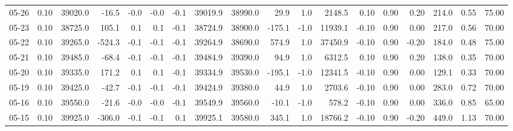 \begin{threeparttable}
{\begin{tabular}{lrrrrrrrrrrrrrrrrr}
  05-26 &     0.10 & 39020.0 &             -16.5 &              -0.0 &               -0.0 &               -0.1 & 39019.9 & 38990.0 &       29.9 &                      1.0 &              2148.5 &       0.10 &      0.90 &           0.20 &            214.0 &            0.55 &                  75.00 \\
  05-23 &     0.10 & 38725.0 &             105.1 &               0.1 &                0.1 &               -0.1 & 38724.9 & 38900.0 &     -175.1 &                     -1.0 &             11939.1 &      -0.10 &      0.90 &           0.00 &            217.0 &            0.56 &                  70.00 \\
  05-22 &     0.10 & 39265.0 &            -524.3 &              -0.1 &               -0.1 &               -0.1 & 39264.9 & 38690.0 &      574.9 &                      1.0 &             37450.9 &      -0.10 &      0.90 &          -0.20 &            184.0 &            0.48 &                  75.00 \\
  05-21 &     0.10 & 39485.0 &             -68.4 &              -0.1 &               -0.1 &               -0.1 & 39484.9 & 39390.0 &       94.9 &                      1.0 &              6312.5 &       0.10 &      0.90 &           0.20 &            138.0 &            0.35 &                  70.00 \\
  05-20 &     0.10 & 39335.0 &             171.2 &               0.1 &                0.1 &               -0.1 & 39334.9 & 39530.0 &     -195.1 &                     -1.0 &             12341.5 &      -0.10 &      0.90 &           0.00 &            129.1 &            0.33 &                  70.00 \\
  05-19 &     0.10 & 39425.0 &             -42.7 &              -0.1 &               -0.1 &               -0.1 & 39424.9 & 39380.0 &       44.9 &                      1.0 &              2703.6 &      -0.10 &      0.90 &           0.00 &            283.0 &            0.72 &                  70.00 \\
  05-16 &     0.10 & 39550.0 &             -21.6 &              -0.0 &               -0.0 &               -0.1 & 39549.9 & 39560.0 &      -10.1 &                     -1.0 &               578.2 &      -0.10 &      0.90 &           0.00 &            336.0 &            0.85 &                  65.00 \\
  05-15 &     0.10 & 39925.0 &            -306.0 &              -0.1 &               -0.1 &                0.1 & 39925.1 & 39580.0 &      345.1 &                      1.0 &             18766.2 &      -0.10 &      0.90 &          -0.20 &            449.0 &            1.13 &                  70.00 \\

\end{tabular}}
\end{threeparttable}
